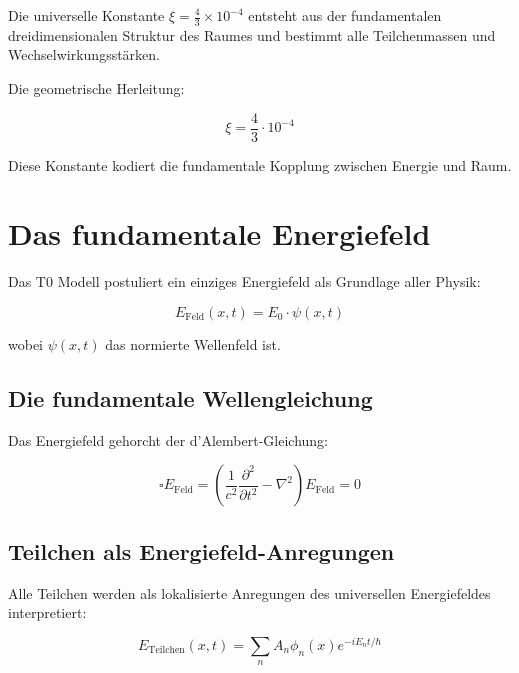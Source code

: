 	\begin{erkenntnis}
		Die universelle Konstante $\xi = \frac{4}{3} \times 10^{-4}$ entsteht aus der fundamentalen dreidimensionalen Struktur des Raumes und bestimmt alle Teilchenmassen und Wechselwirkungsstärken.
	\end{erkenntnis}
	
	Die geometrische Herleitung:
	
	\begin{equation}
		\xi = \frac{4}{3} \cdot 10^{-4}
	\end{equation}
	
	Diese Konstante kodiert die fundamentale Kopplung zwischen Energie und Raum.
	
	
	\section{Das fundamentale Energiefeld}
	
	Das T0 Modell postuliert ein einziges Energiefeld als Grundlage aller Physik:
	
	\begin{equation}
		E_{\text{Feld}}(x,t) = E_0 \cdot \psi(x,t)
	\end{equation}
	
	wobei $\psi(x,t)$ das normierte Wellenfeld ist.
	
	\subsection{Die fundamentale Wellengleichung}
	
	Das Energiefeld gehorcht der d'Alembert-Gleichung:
	
	\begin{equation}
		\square E_{\text{Feld}} = \left(\frac{1}{c^2}\frac{\partial^2}{\partial t^2} - \nabla^2\right) E_{\text{Feld}} = 0
	\end{equation}
	
	\subsection{Teilchen als Energiefeld-Anregungen}
	
	Alle Teilchen werden als lokalisierte Anregungen des universellen Energiefeldes interpretiert:
	
	\begin{equation}
		E_{\text{Teilchen}}(x,t) = \sum_n A_n \phi_n(x) e^{-iE_n t/\hbar}
	\end{equation}
	
